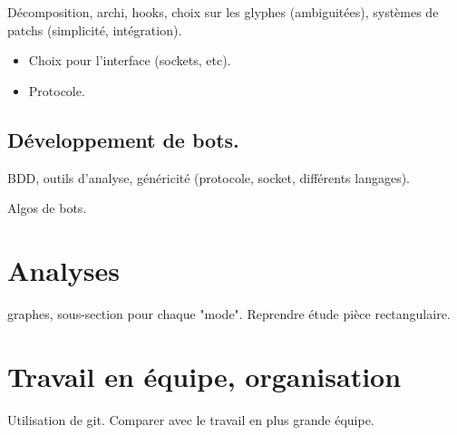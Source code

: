 \documentclass[a4paper]{article}
\begin{document}
Décomposition, archi, hooks, choix sur les glyphes (ambiguitées), systèmes de
patchs (simplicité, intégration).

\begin{itemize}
\item Choix pour l'interface (sockets, etc).
\item Protocole.
\end{itemize}

\subsection{Développement de bots.}

BDD, outils d'analyse, généricité (protocole, socket, différents langages).

Algos de bots.


\section{Analyses}

graphes, sous-section pour chaque "mode". Reprendre étude pièce rectangulaire.


\section{Travail en équipe, organisation}

Utilisation de git.
Comparer avec le travail en plus grande équipe.
\end{document}
